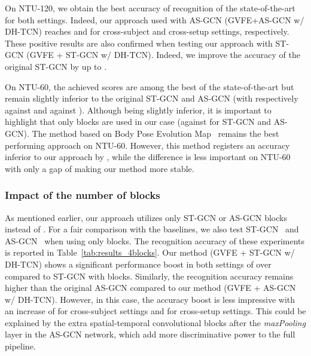 \documentclass{article}
\begin{document}
On NTU-120, we obtain the best accuracy of recognition of the state-of-the-art for both settings. Indeed, our approach used with AS-GCN (GVFE+AS-GCN w/ DH-TCN) reaches  and  for cross-subject and cross-setup settings, respectively. These positive results are also confirmed when testing our approach with ST-GCN (GVFE + ST-GCN w/ DH-TCN). Indeed, we improve the accuracy of the original ST-GCN by  up to .   

On NTU-60, the achieved scores are among the best of the state-of-the-art but remain slightly inferior to the original ST-GCN and AS-GCN (with respectively  against  and  against ). Although being slightly inferior, it is important to highlight that only  blocks are used in our case (against  for ST-GCN and AS-GCN). The method based on Body Pose Evolution Map~\cite{liu2018recognizing} remains the best performing approach on NTU-60. 
However, this method registers an accuracy inferior to our approach by , while the difference is less important on NTU-60 with only a gap of  making our method more stable.

\subsubsection{Impact of the number of blocks}

As mentioned earlier, our approach utilizes only  ST-GCN or AS-GCN blocks instead of . For a fair comparison with the baselines, we also test ST-GCN~\cite{yan2018spatial} and AS-GCN~\cite{li2019actional} when using only  blocks. The recognition accuracy of these experiments is reported in Table~\ref{tab:results_4blocks}.
Our method (GVFE + ST-GCN w/ DH-TCN) shows a significant performance boost in both settings of over  compared to ST-GCN with  blocks. Similarly, the recognition accuracy remains higher than the original AS-GCN compared to our method (GVFE + AS-GCN w/ DH-TCN). However, in this case, the accuracy boost is less impressive with an increase of  for cross-subject settings and  for cross-setup settings. This could be explained by the  extra spatial-temporal convolutional blocks after the {\em maxPooling} layer in the AS-GCN network, which add more discriminative power to the full pipeline.
\end{document}
